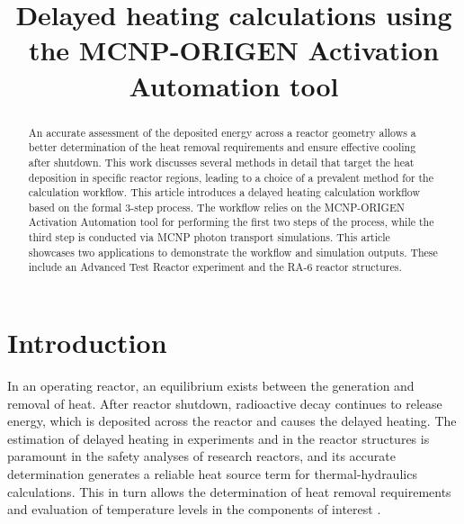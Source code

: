\documentclass{style/nseJournal}
\begin{document}
\title{Delayed heating calculations using the MCNP-ORIGEN Activation Automation tool}

{}
{}

{}



\titlePage

\begin{abstract}
An accurate assessment of the deposited energy across a reactor geometry allows a better determination of the heat removal requirements and ensure effective cooling after shutdown.
This work discusses several methods in detail that target the heat deposition in specific reactor regions, leading to a choice of a prevalent method for the calculation workflow.
This article introduces a delayed heating calculation workflow based on the formal 3-step process.
The workflow relies on the MCNP-ORIGEN Activation Automation tool for performing the first two steps of the process, while the third step is conducted via MCNP photon transport simulations.
This article showcases two applications to demonstrate the workflow and simulation outputs.
These include an Advanced Test Reactor experiment and the RA-6 reactor structures.
\end{abstract}

\section{Introduction}

In an operating reactor, an equilibrium exists between the generation and removal of heat.
After reactor shutdown, radioactive decay continues to release energy, which is deposited across the reactor and causes the delayed heating.
The estimation of delayed heating in experiments and in the reactor structures is paramount in the safety analyses of research reactors, and its accurate determination generates a reliable heat source term for thermal-hydraulics calculations.
This in turn allows the determination of heat removal requirements and evaluation of temperature levels in the components of interest \cite{fairhurst_decay_2022, fairhurst_machine_2022, fairhurst_machine_2_2022}.
\end{document}
